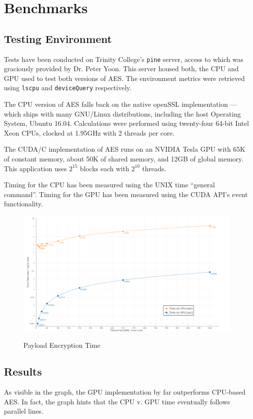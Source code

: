 \documentclass[letterpaper,twocolumn,10pt]{article}
\begin{document}
\section{Benchmarks}
\subsection{Testing Environment}
Tests have been conducted on Trinity College's \texttt{pine} server, access to which was graciously provided by Dr. Peter Yoon. This server housed both, the CPU and GPU used to test both versions of AES. The environment metrics were retrieved using \texttt{lscpu} and \texttt{deviceQuery} respectively.

The CPU version of AES falls back on the native openSSL implementation --- which ships with many GNU/Linux distributions, including the host Operating System, Ubuntu 16.04. Calculations were performed using twenty-four 64-bit Intel Xeon CPUs, clocked at 1.95GHz with 2 threads per core.

The CUDA/C implementation of AES runs on an NVIDIA Tesla GPU with 65K of constant memory, about 50K of shared memory, and 12GB of global memory. This application uses $2^15$ blocks each with $2^10$ threads.

Timing for the CPU has been measured using the UNIX time ``general command''. Timing for the GPU has been measured using the CUDA API's event functionality.

\begin{figure}
\includegraphics[scale=0.16]{HPC}
\label{Tesla}
\caption{
    Payload Encryption Time
}

\end{figure}
\subsection{Results}
As visible in the graph, the GPU implementation by far outperforms CPU-based AES. In fact, the graph hints that the CPU v. GPU time eventually follows parallel lines.
\end{document}
